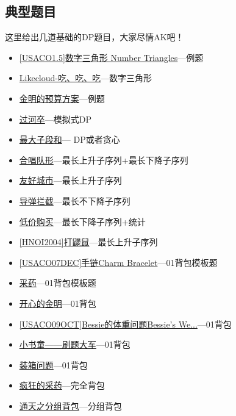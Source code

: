 \documentclass{article}
\theoremstyle{nonumberplain}
\begin{document}
	\subsection{典型题目}
	这里给出几道基础的DP题目，大家尽情AK吧！
	\begin{itemize}
		\item{\href{https://www.luogu.org/problem/show?pid=1216}{[USACO1.5]数字三角形 Number Triangles}---例题}
		\item{\href{https://www.luogu.org/problem/show?pid=1508}{Likecloud-吃、吃、吃}---数字三角形}
		\item{\href{https://www.luogu.org/problem/show?pid=1064}{金明的预算方案}---例题}
		\item{\href{https://www.luogu.org/problem/show?pid=1002}{过河卒}---模拟式DP}
		\item{\href{https://www.luogu.org/problem/show?pid=1115}{最大子段和}--- DP或者贪心}
		\item{\href{https://www.luogu.org/problem/show?pid=1091}{合唱队形}---最长上升子序列+最长下降子序列}
		\item{\href{https://www.luogu.org/problem/show?pid=2782}{友好城市}---最长上升子序列}
		\item{\href{https://www.luogu.org/problem/show?pid=1020}{导弹拦截}---最长不下降子序列}
		\item{\href{https://www.luogu.org/problem/show?pid=1108}{低价购买}---最长下降子序列+统计}
		\item{\href{https://www.luogu.org/problem/show?pid=2285}{[HNOI2004]打鼹鼠}---最长上升子序列}
		\item{\href{https://www.luogu.org/problem/show?pid=2871}{[USACO07DEC]手链Charm Bracelet}---01背包模板题}
		\item{\href{https://www.luogu.org/problem/show?pid=1048}{采药}---01背包模板题}
		\item{\href{https://www.luogu.org/problem/show?pid=1060}{开心的金明}---01背包}
		\item{\href{https://www.luogu.org/problem/show?pid=2639}{[USACO09OCT]Bessie的体重问题Bessie's We...}---01背包}
		\item{\href{https://www.luogu.org/problem/show?pid=1926}{小书童——刷题大军}---01背包}
		\item{\href{https://www.luogu.org/problem/show?pid=1049}{装箱问题}---01背包}
		\item{\href{https://www.luogu.org/problem/show?pid=1616}{疯狂的采药}---完全背包}
		\item{\href{https://www.luogu.org/problem/show?pid=1757}{通天之分组背包}---分组背包}

\end{itemize}
\end{document}
